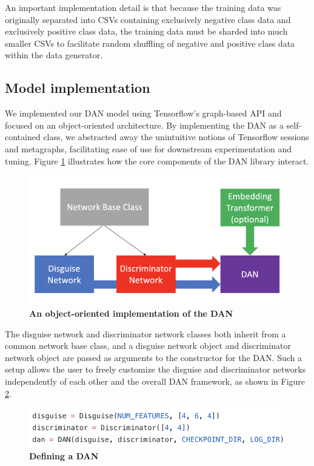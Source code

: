 \documentclass{proc}
\begin{document}
An important implementation detail is that because the training data was originally separated into CSVs containing exclusively negative class data and exclusively positive class data, the training data must be sharded into much smaller CSVs to facilitate random shuffling of negative and positive class data within the data generator.

\subsection{Model implementation}

We implemented our DAN model using Tensorflow's graph-based API and focused on an object-oriented architecture. By implementing the DAN as a self-contained class, we abstracted away the unintuitive notions of Tensorflow sessions and metagraphs, facilitating ease of use for downstream experimentation and tuning. Figure \ref{fig:dan-implementation} illustrates how the core components of the DAN library interact.

\begin{figure}[h!]
		\includegraphics*[scale=0.28]{../figures/dan-implementation.png}
		\caption{\textbf{An object-oriented implementation of the DAN}}
		\label{fig:dan-implementation}
\end{figure}

The disguise network and discriminator network classes both inherit from a common network base class, and a disguise network object and discriminator network object are passed as arguments to the constructor for the DAN. Such a setup allows the user to freely customize the disguise and discriminator networks independently of each other and the overall DAN framework, as shown in Figure \ref{fig:dan-usage}.

\begin{figure}[h!]
		\includegraphics*[scale=0.6]{../figures/dan-usage.png}
		\caption{\textbf{Defining a DAN}}
		\label{fig:dan-usage}
\end{figure}
\end{document}
